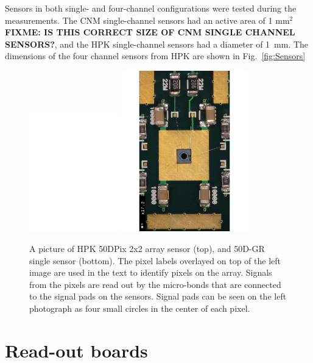 \documentclass[preprint,1p]{elsarticle}
\begin{document}
Sensors in both single- and four-channel configurations were tested during the
measurements. The CNM single-channel sensors had an active area of 1 mm$^2$ {\bf
FIXME: IS THIS CORRECT SIZE OF CNM SINGLE CHANNEL SENSORS?}, and the HPK
single-channel sensors had a diameter of 1~mm. The dimensions of the four
channel sensors from HPK are shown in Fig.~\ref{fig:Sensors}

\begin{figure}[htbp] 
\centering
\includegraphics[width=0.35\textwidth]{figs/HPK-50DPix.pdf} 
\includegraphics[width=0.48\textwidth]{figs/HPK-50D.pdf} 
\caption{A picture of HPK 50DPix 2x2 array sensor (top), and 50D-GR single sensor (bottom). The pixel labels overlayed on top of the left image are used in the text to identify pixels on the array. Signals from the pixels are read out by the micro-bonds that are connected to the signal pads on the sensors. Signal pads can be seen on the left photograph as four small circles in the center of each pixel. } 
\label{fig:HPK_Sensors} 
\end{figure} 


\section{Read-out boards}
\end{document}
